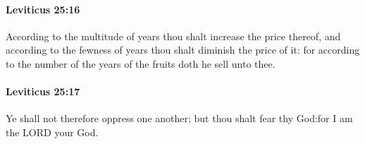 		\paragraph{Leviticus 25:16} %
			\label{LEVITICUS-25-16}

			According to the multitude of years thou shalt increase the price thereof, and according to the fewness of years thou shalt diminish the price of it: for according to the number of the years of the fruits doth he sell unto thee.


		\paragraph{Leviticus 25:17} %
			\label{LEVITICUS-25-17}

			Ye shall not therefore oppress one another; but thou shalt fear thy God:for I am the LORD your God.


